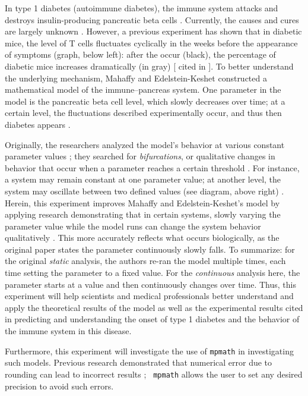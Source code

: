 
In type 1 diabetes (autoimmune diabetes), the immune system attacks and
destroys insulin-producing pancreatic beta cells \cite{PubMed2013}.
Currently, the causes and cures are largely unknown \cite{Daneman2006}.
However, a previous experiment has shown that in diabetic mice, the level of
T cells fluctuates cyclically in the weeks before the appearance of symptoms
(graph, below left): after the  occur (black), the
percentage of diabetic mice increases dramatically (in gray)
[\cite{Trudeau2003} cited in \cite{Mahaffy2007}]. To better understand the
underlying mechanism, Mahaffy and Edelstein-Keshet constructed a
mathematical model of the immune–pancreas system. One parameter in the model
is the pancreatic beta cell level, which slowly decreases over time; at a
certain level, the fluctuations described experimentally occur, and thus
then diabetes appears \cite{Mahaffy2007}.

\setupcaptions[location=bottom,width=10in]


Originally, the researchers analyzed the model’s behavior at various
constant parameter values \cite{Mahaffy2007}; they searched for {\em
  bifurcations}, or qualitative changes in behavior that occur when a
parameter reaches a certain threshold \cite{VanVoorn2006}. For instance, a
system may remain constant at one parameter value; at another level, the
system may oscillate between two defined values (see diagram, above right)
\cite{VanVoorn2006}. Herein, this experiment improves Mahaffy and
Edelstein-Keshet’s model by applying research demonstrating that in certain
systems, slowly varying the parameter value while the model runs can change
the system behavior qualitatively \cite{Baer1989}. This more accurately
reflects what occurs biologically, as the original paper states the
parameter continuously slowly falls. To summarize: for the original {\em
  static} analysis, the authors re-ran the model multiple times, each time
setting the parameter to a fixed value. For the {\em continuous} analysis
here, the parameter starts at a value and then continuously changes over
time. Thus, this experiment will help scientists and medical professionals
better understand and apply the theoretical results of the model as well as
the experimental results cited in predicting and understanding the onset of
type 1 diabetes and the behavior of the immune system in this disease.

Furthermore, this experiment will investigate the use of {\tt mpmath} in
investigating such models. Previous research demonstrated that numerical
error due to rounding can lead to incorrect results \cite{Baer1989}; {\tt
  mpmath} allows the user to set any desired precision to avoid such errors.
